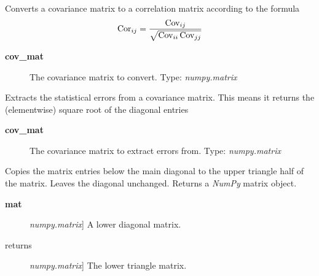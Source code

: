 \documentclass[a4paper,10pt,english]{sphinxmanual}
\begin{document}

\begin{fulllineitems}
\label{index:kafe.numeric_tools.cov_to_cor}
Converts a covariance matrix to a correlation matrix according to the formula
\begin{gather}
\begin{split}\text{Cor}_{ij} = \frac{\text{Cov}_{ij}}{\sqrt{ \text{Cov}_{ii}\,\text{Cov}_{jj}}}\end{split}\notag
\end{gather}\begin{description}
\item[{\textbf{cov\_mat}}] \leavevmode
The covariance matrix to convert. Type: \emph{numpy.matrix}

\end{description}

\end{fulllineitems}


\begin{fulllineitems}
\label{index:kafe.numeric_tools.extract_statistical_errors}
Extracts the statistical errors from a covariance matrix. This means
it returns the (elementwise) square root of the diagonal entries
\begin{description}
\item[{\textbf{cov\_mat}}] \leavevmode
The covariance matrix to extract errors from. Type: \emph{numpy.matrix}

\end{description}

\end{fulllineitems}


\begin{fulllineitems}
\label{index:kafe.numeric_tools.make_symmetric_lower}
Copies the matrix entries below the main diagonal to the upper triangle half of
the matrix. Leaves the diagonal unchanged. Returns a \emph{NumPy} matrix object.
\begin{description}
\item[{\textbf{mat}}] \leavevmode{[}\emph{numpy.matrix}{]}
A lower diagonal matrix.

\item[{returns}] \leavevmode{[}\emph{numpy.matrix}{]}
The lower triangle matrix.

\end{description}

\end{fulllineitems}
\end{document}
